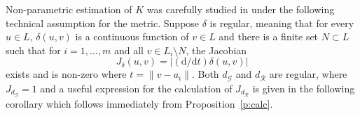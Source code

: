\documentclass[alpha-refs]{wiley-article}
\begin{document}
Non-parametric estimation of $K$ was carefully studied in \citet{RakshitEtAl} under the following technical assumption for the metric.  
Suppose $\delta$ is regular, meaning that for every $u\in L$, 
$\delta(u,v)$ is a continuous function of $v\in L$ and 
there is a finite set $N\subset L$ such that for $i=1,\ldots,m$ and all $v\in L_i\setminus N$, the Jacobian 
\begin{equation}\label{e:Jacobian}
J_\delta(u,v)=|(\mathrm d/\mathrm dt) \delta(u,v)|
\end{equation}
exists and is non-zero where $t=\|v-a_i\|$. 
 Both $d_\mathcal{G}$ and $d_\mathcal{R}$ are regular, where $J_{d_\mathcal{G}}=1$ and a useful expression for the calculation of $J_{d_\mathcal{R}}$ is given in the following corollary which follows immediately from Proposition~\ref{p:calc}.
 
 
\end{document}
